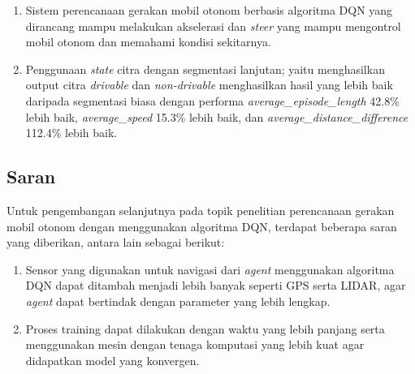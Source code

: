 \documentclass[conference]{IEEEtran}
\begin{document}
	\begin{enumerate}[nolistsep]
		
		\item Sistem perencanaan gerakan mobil otonom berbasis algoritma DQN yang dirancang mampu melakukan akselerasi dan \textit{steer} yang mampu mengontrol mobil otonom dan memahami kondisi sekitarnya.
		
		\item Penggunaan \textit{state } citra dengan segmentasi lanjutan; yaitu menghasilkan output citra \textit{drivable }dan \textit{non-drivable} menghasilkan hasil yang lebih baik daripada segmentasi biasa dengan performa \textit{average\_episode\_length} 42.8\% lebih baik, \textit{average\_speed} 15.3\% lebih baik, dan \textit{average\_distance\_difference} 112.4\% lebih baik.
		
	\end{enumerate}
	
	\subsection{Saran}
	\label{chap:saran}
	
	Untuk pengembangan selanjutnya pada topik penelitian perencanaan gerakan mobil otonom dengan menggunakan algoritma DQN, terdapat beberapa saran yang diberikan, antara lain sebagai berikut:
	
	\begin{enumerate}[nolistsep]
		
		\item Sensor yang digunakan untuk navigasi dari \textit{agent }menggunakan algoritma DQN dapat ditambah menjadi lebih banyak seperti GPS serta LIDAR, agar \textit{agent} dapat bertindak dengan parameter yang lebih lengkap.
		
		\item Proses training dapat dilakukan dengan waktu yang lebih panjang serta menggunakan mesin dengan tenaga komputasi yang lebih kuat agar didapatkan model yang konvergen.
	\end{enumerate}
	
	
	
\end{document}
